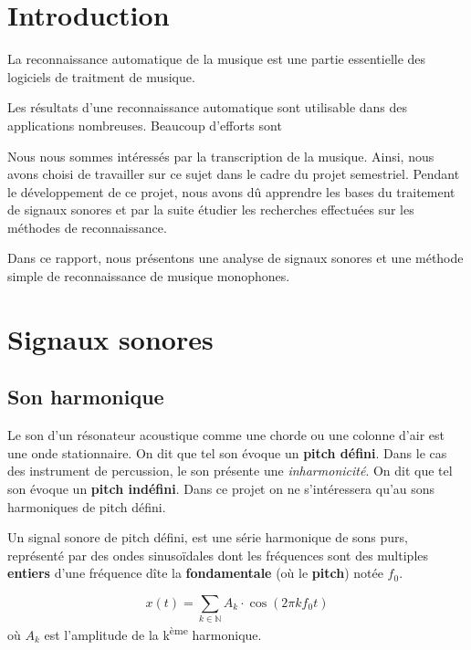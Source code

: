 \documentclass[]{article}
\begin{document}
{
\setcounter{tocdepth}{2}
\tableofcontents
}
\pagebreak

\hypertarget{introduction}{%
\section{Introduction}\label{introduction}}

La reconnaissance automatique de la musique est une partie essentielle
des logiciels de traitment de musique.

Les résultats d'une reconnaissance automatique sont utilisable dans des
applications nombreuses. Beaucoup d'efforts sont

Nous nous sommes intéressés par la transcription de la musique. Ainsi,
nous avons choisi de travailler sur ce sujet dans le cadre du projet
semestriel. Pendant le développement de ce projet, nous avons dû
apprendre les bases du traitement de signaux sonores et par la suite
étudier les recherches effectuées sur les méthodes de reconnaissance.

Dans ce rapport, nous présentons une analyse de signaux sonores et une
méthode simple de reconnaissance de musique monophones.

\hypertarget{signaux-sonores}{%
\section{Signaux sonores}\label{signaux-sonores}}

\hypertarget{son-harmonique}{%
\subsection{Son harmonique}\label{son-harmonique}}

Le son d'un résonateur acoustique comme une chorde ou une colonne d'air
est une onde stationnaire. On dit que tel son évoque un \textbf{pitch
défini}. Dans le cas des instrument de percussion, le son présente une
\emph{inharmonicité}. On dit que tel son évoque un \textbf{pitch
indéfini}. Dans ce projet on ne s'intéressera qu'au sons harmoniques de
pitch défini.

Un signal sonore de pitch défini, est une série harmonique de sons purs,
représenté par des ondes sinusoïdales dont les fréquences sont des
multiples \textbf{entiers} d'une fréquence dîte la \textbf{fondamentale}
(où le \textbf{pitch}) notée \(f_0\).

\[ x(t) = \sum\limits_{k\in\mathbb{N}} A_k\cdot\cos(2\pi k f_0 t) \] où
\(A_k\) est l'amplitude de la k\textsuperscript{ème} harmonique.
\end{document}
